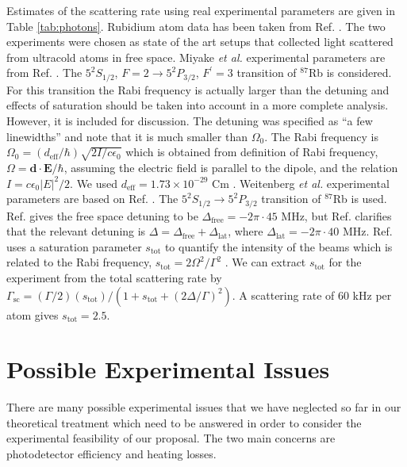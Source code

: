 Estimates of the scattering rate using real experimental parameters
are given in Table \ref{tab:photons}. Rubidium atom data has been
taken from Ref. \cite{steck}. The two experiments were chosen as state
of the art setups that collected light scattered from ultracold atoms
in free space. Miyake \emph{et al.} experimental parameters are from
Ref. \cite{miyake2011}. The $5^2S_{1/2}$,
$F=2 \rightarrow 5^2P_{3/2}$, $F^\prime = 3$ transition of $^{87}$Rb
is considered. For this transition the Rabi frequency is actually
larger than the detuning and effects of saturation should be taken
into account in a more complete analysis. However, it is included for
discussion. The detuning was specified as ``a few linewidths'' and
note that it is much smaller than $\Omega_0$. The Rabi frequency is
$\Omega_0 = (d_\mathrm{eff}/\hbar)\sqrt{2 I / c \epsilon_0}$ which is
obtained from definition of Rabi frequency,
$\Omega = \mathbf{d} \cdot \mathbf{E} / \hbar$, assuming the electric
field is parallel to the dipole, and the relation
$I = c \epsilon_0 |E|^2 /2$. We used
$d_\mathrm{eff} = 1.73 \times 10^{-29}$ Cm \cite{steck}. Weitenberg
\emph{et al.} experimental parameters are based on
Ref. \cite{weitenberg2011, weitenbergThesis}. The
$5^2S_{1/2} \rightarrow 5^2P_{3/2}$ transition of $^{87}$Rb is
used. Ref. \cite{weitenberg2011} gives the free space detuning to be
$\Delta_\mathrm{free} = - 2 \pi \cdot 45$ MHz, but
Ref. \cite{weitenbergThesis} clarifies that the relevant detuning is
$\Delta = \Delta_\mathrm{free} + \Delta_\mathrm{lat}$, where
$\Delta_\mathrm{lat} = - 2 \pi \cdot 40$
MHz. Ref. \cite{weitenbergThesis} uses a saturation parameter
$s_\mathrm{tot}$ to quantify the intensity of the beams which is
related to the Rabi frequency,
$s_\mathrm{tot} = 2 \Omega^2 / \Gamma^2$ \cite{steck,foot}. We can
extract $s_\mathrm{tot}$ for the experiment from the total scattering
rate by
$\Gamma_\mathrm{sc} = (\Gamma/2) (s_\mathrm{tot}) /
(1+s_\mathrm{tot}+(2 \Delta / \Gamma)^2)$. A scattering rate of 60 kHz
per atom \cite{weitenberg2011} gives $s_\mathrm{tot} = 2.5$.

\section{Possible Experimental Issues}

There are many possible experimental issues that we have neglected so
far in our theoretical treatment which need to be answered in order to
consider the experimental feasibility of our proposal. The two main
concerns are photodetector efficiency and heating losses.


